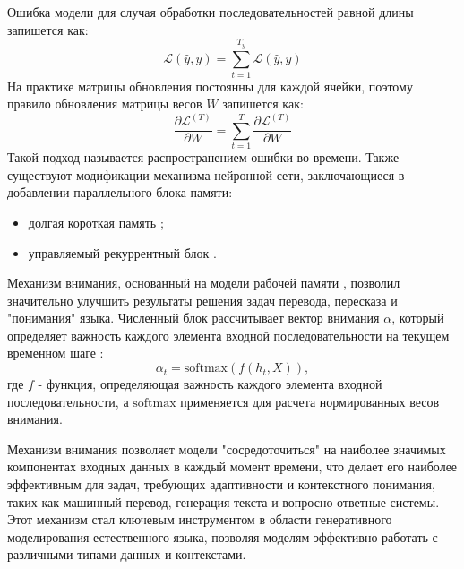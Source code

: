 Ошибка модели для случая обработки последовательностей равной длины запишется как:
\begin{equation}
    \mathcal{L}(\hat{y},y) = \sum_{t=1}^{T_y} \mathcal{L}(\hat{y},y)
\end{equation}
На практике матрицы обновления постоянны для каждой ячейки, поэтому правило обновления матрицы весов $W$ запишется как:
\begin{equation}
    \frac{\partial \mathcal{L}^{(T)}}{\partial W} = \sum_{t=1}^T \frac{\partial \mathcal{L}^{(T)} }{\partial W}
\end{equation}
Такой подход называется распространением ошибки во времени. Также существуют модификации механизма нейронной сети,
заключающиеся в добавлении параллельного блока памяти:
\begin{itemize}
    \item долгая короткая память \cite{hochreiter1997long};
    \item управляемый рекуррентный блок \cite{chung2014empirical}.
\end{itemize}

Механизм внимания, основанный на модели рабочей памяти \cite{wallace1960plans}, позволил значительно улучшить результаты
решения задач перевода, пересказа и "понимания" языка. Численный блок рассчитывает вектор внимания \( \alpha \), 
который определяет важность каждого элемента входной последовательности на текущем временном шаге \cite{bahdanau2014neural}:
\begin{equation}
    \alpha_t = \text{softmax}(f(h_t, X)),
\end{equation}
где \( f \) - функция, определяющая важность каждого элемента входной последовательности, 
а \( \text{softmax} \) применяется для расчета нормированных весов внимания.


Механизм внимания позволяет модели "сосредоточиться" на наиболее значимых компонентах входных данных в каждый момент времени, 
что делает его наиболее эффективным для задач, требующих адаптивности и контекстного понимания, таких как машинный перевод, 
генерация текста и вопросно-ответные системы. Этот механизм стал ключевым инструментом в области генеративного 
моделирования естественного языка, позволяя моделям эффективно работать с различными типами данных и контекстами.

